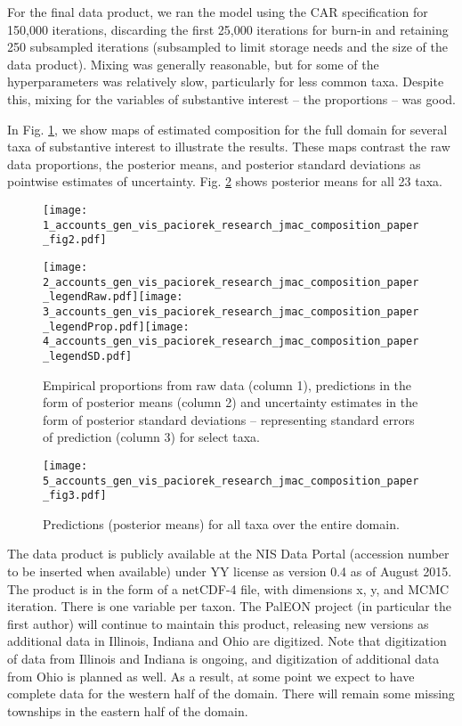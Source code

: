 \documentclass[12pt]{article}\usepackage[]{graphicx}\usepackage[]{color}
\begin{document}
For the final data product, we ran the model using the CAR specification
for 150,000 iterations, discarding the first 25,000 iterations for
burn-in and retaining 250 subsampled iterations (subsampled to limit
storage needs and the size of the data product). Mixing was generally
reasonable, but for some of the hyperparameters was relatively slow,
particularly for less common taxa. Despite this, mixing for the variables
of substantive interest -- the proportions -- was good.

In Fig. \ref{fig:select_maps}, we show maps of estimated composition
for the full domain for several taxa of substantive interest to illustrate
the results. These maps contrast the raw data proportions, the posterior
means, and posterior standard deviations as pointwise estimates of
uncertainty. Fig. \ref{fig:all_predictions} shows posterior means
for all 23 taxa.

\begin{figure}
\texttt{[image: 1\_accounts\_gen\_vis\_paciorek\_research\_jmac\_composition\_paper\_fig2.pdf]}

\hspace{4mm}\texttt{[image: 2\_accounts\_gen\_vis\_paciorek\_research\_jmac\_composition\_paper\_legendRaw.pdf]}\hspace{4mm}\texttt{[image: 3\_accounts\_gen\_vis\_paciorek\_research\_jmac\_composition\_paper\_legendProp.pdf]}\hspace{3.5mm}\texttt{[image: 4\_accounts\_gen\_vis\_paciorek\_research\_jmac\_composition\_paper\_legendSD.pdf]}

\caption{Empirical proportions from raw data (column 1), predictions in the
form of posterior means (column 2) and uncertainty estimates in the
form of posterior standard deviations -- representing standard errors
of prediction (column 3) for select taxa. \label{fig:select_maps}}
\end{figure}


\begin{figure}
\texttt{[image: 5\_accounts\_gen\_vis\_paciorek\_research\_jmac\_composition\_paper\_fig3.pdf]}

\caption{Predictions (posterior means) for all taxa over the entire domain.\label{fig:all_predictions}}


\end{figure}


The data product is publicly available at the NIS Data Portal (accession
number to be inserted when available) under YY license as version
0.4 as of August 2015. The product is in the form of a netCDF-4 file,
with dimensions x, y, and MCMC iteration. There is one variable per
taxon. The PalEON project (in particular the first author) will continue
to maintain this product, releasing new versions as additional data
in Illinois, Indiana and Ohio are digitized. Note that digitization
of data from Illinois and Indiana is ongoing, and digitization of
additional data from Ohio is planned as well. As a result, at some
point we expect to have complete data for the western half of the
domain. There will remain some missing townships in the eastern half
of the domain.
\end{document}
